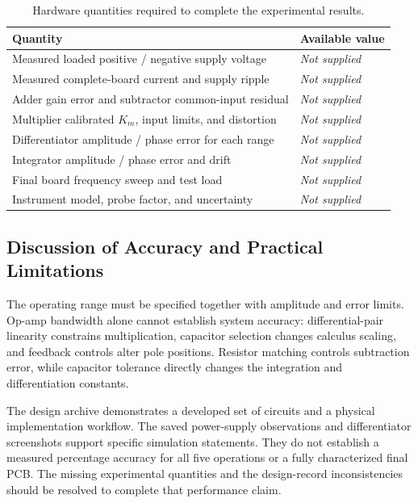 \documentclass[11pt,a4paper]{article}
\newcommand{\notrecorded}{\textit{Not supplied}}
\begin{document}
\begin{table}[htbp]
\centering\small
\caption{Hardware quantities required to complete the experimental results.}
\begin{tabularx}{\textwidth}{P{0.58\textwidth}Y}
\toprule
\textbf{Quantity} & \textbf{Available value}\\
\midrule
Measured loaded positive / negative supply voltage & \notrecorded\\
Measured complete-board current and supply ripple & \notrecorded\\
Adder gain error and subtractor common-input residual & \notrecorded\\
Multiplier calibrated $K_m$, input limits, and distortion & \notrecorded\\
Differentiator amplitude / phase error for each range & \notrecorded\\
Integrator amplitude / phase error and drift & \notrecorded\\
Final board frequency sweep and test load & \notrecorded\\
Instrument model, probe factor, and uncertainty & \notrecorded\\
\bottomrule
\end{tabularx}
\end{table}

\subsection{Discussion of Accuracy and Practical Limitations}
The operating range must be specified together with amplitude and error limits. Op-amp bandwidth alone cannot establish system accuracy: differential-pair linearity constrains multiplication, capacitor selection changes calculus scaling, and feedback controls alter pole positions. Resistor matching controls subtraction error, while capacitor tolerance directly changes the integration and differentiation constants.

The design archive demonstrates a developed set of circuits and a physical implementation workflow. The saved power-supply observations and differentiator screenshots support specific simulation statements. They do not establish a measured percentage accuracy for all five operations or a fully characterized final PCB. The missing experimental quantities and the design-record inconsistencies should be resolved to complete that performance claim.
\end{document}
